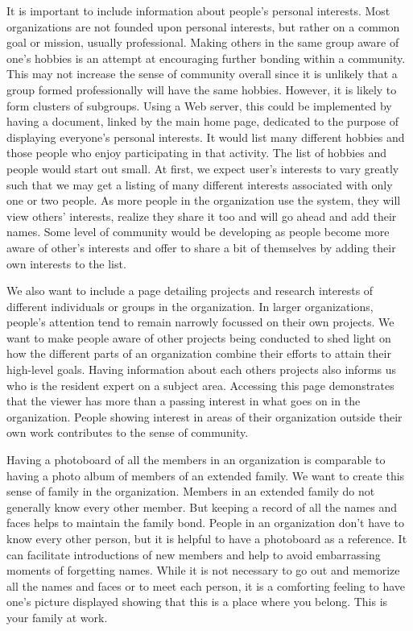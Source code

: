 It is important to include information about people's personal interests.
Most organizations are not founded upon personal interests, but rather on a
common goal or mission, usually professional.  Making others in the same
group aware of one's hobbies is an attempt at encouraging further bonding
within a community.  This may not increase the sense of community overall
since it is unlikely that a group formed professionally will have the same
hobbies.  However, it is likely to form clusters of subgroups.  Using a Web
server, this could be implemented by having a document, linked by the main
home page, dedicated to the purpose of displaying everyone's personal
interests.  It would list many different hobbies and those people who enjoy
participating in that activity.  The list of hobbies and people would start
out small.  At first, we expect user's interests to vary greatly such that
we may get a listing of many different interests associated with only one
or two people.  As more people in the organization use the system, they
will view others' interests, realize they share it too and will go ahead
and add their names.  Some level of community would be developing as people
become more aware of other's interests and offer to share a bit of
themselves by adding their own interests to the list.

We also want to include a page detailing projects and research interests of
different individuals or groups in the organization.  In larger
organizations, people's attention tend to remain narrowly focussed on their
own projects.  We want to make people aware of other projects being
conducted to shed light on how the different parts of an organization
combine their efforts to attain their high-level goals.  Having information
about each others projects also informs us who is the resident expert on a
subject area.  Accessing this page demonstrates that the viewer has more
than a passing interest in what goes on in the organization.  People showing
interest in areas of their organization outside their own work contributes
to the sense of community.

Having a photoboard of all the members in an organization is comparable to
having a photo album of members of an extended family.  We want to create
this sense of family in the organization.  Members in an extended family do
not generally know every other member.  But keeping a record of all the
names and faces helps to maintain the family bond.  People in an
organization don't have to know every other person, but it is helpful to
have a photoboard as a reference.  It can facilitate introductions of new
members and help to avoid embarrassing moments of forgetting names.  While
it is not necessary to go out and memorize all the names and faces or to
meet each person, it is a comforting feeling to have one's picture
displayed showing that this is a place where you belong.  This is your
family at work.  

